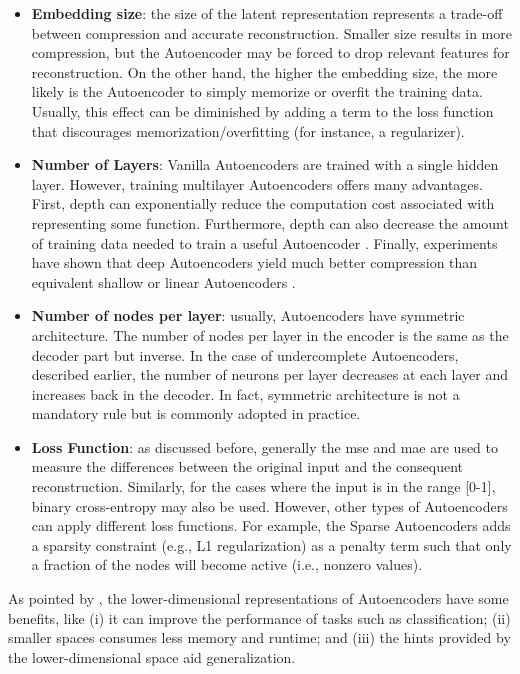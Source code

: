 \begin{itemize}
\item \textbf{Embedding size}: the size of the latent representation represents a trade-off between compression and accurate reconstruction. Smaller size results in more compression, but the Autoencoder may be forced to drop relevant features for reconstruction. On the other hand, the higher the embedding size, the more likely is the Autoencoder to simply memorize or overfit the training data. Usually, this effect can be diminished by adding a term to the loss function that discourages memorization/overfitting (for instance, a regularizer).

\item \textbf{Number of Layers}: Vanilla Autoencoders are trained with a single hidden layer. However, training multilayer Autoencoders offers many advantages. First, depth can exponentially reduce the computation cost associated with representing some function. Furthermore, depth can also decrease the amount of training data needed to train a useful Autoencoder \citep{lecun2015deep}. Finally, experiments have shown that deep Autoencoders yield much better compression than equivalent shallow or linear Autoencoders \citep{hinton2006reducing}.

\item \textbf{Number of nodes per layer}: usually, Autoencoders have symmetric architecture. The number of nodes per layer in the encoder is the same as the decoder part but inverse. In the case of undercomplete Autoencoders, described earlier, the number of neurons per layer decreases at each layer and increases back in the decoder. In fact, symmetric architecture is not a mandatory rule but is commonly adopted in practice.

\item \textbf{Loss Function}: as discussed before, generally the \acs{mse} and \acs{mae} are used to measure the differences between the original input and the consequent reconstruction. Similarly, for the cases where the input is in the range [0-1], binary cross-entropy may also be used. However, other types of Autoencoders can apply different loss functions. For example, the Sparse Autoencoders adds a sparsity constraint (e.g., L1 regularization) as a penalty term such that only a fraction of the nodes will become active (i.e., nonzero values).
\end{itemize}

As pointed by \cite{lecun2015deep}, the lower-dimensional representations of Autoencoders have some benefits, like (i) it can improve the performance of tasks such as classification; (ii) smaller spaces consumes less memory and runtime; and (iii) the hints provided by the lower-dimensional space aid generalization.

